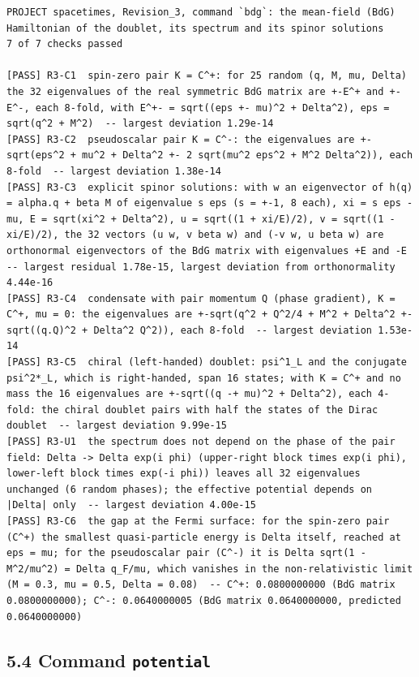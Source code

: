 \documentclass[
  10pt,
]{article}
\begin{document}
\begin{verbatim}
PROJECT spacetimes, Revision_3, command `bdg`: the mean-field (BdG) Hamiltonian of the doublet, its spectrum and its spinor solutions
7 of 7 checks passed

[PASS] R3-C1  spin-zero pair K = C^+: for 25 random (q, M, mu, Delta) the 32 eigenvalues of the real symmetric BdG matrix are +-E^+ and +-E^-, each 8-fold, with E^+- = sqrt((eps +- mu)^2 + Delta^2), eps = sqrt(q^2 + M^2)  -- largest deviation 1.29e-14
[PASS] R3-C2  pseudoscalar pair K = C^-: the eigenvalues are +-sqrt(eps^2 + mu^2 + Delta^2 +- 2 sqrt(mu^2 eps^2 + M^2 Delta^2)), each 8-fold  -- largest deviation 1.38e-14
[PASS] R3-C3  explicit spinor solutions: with w an eigenvector of h(q) = alpha.q + beta M of eigenvalue s eps (s = +-1, 8 each), xi = s eps - mu, E = sqrt(xi^2 + Delta^2), u = sqrt((1 + xi/E)/2), v = sqrt((1 - xi/E)/2), the 32 vectors (u w, v beta w) and (-v w, u beta w) are orthonormal eigenvectors of the BdG matrix with eigenvalues +E and -E  -- largest residual 1.78e-15, largest deviation from orthonormality 4.44e-16
[PASS] R3-C4  condensate with pair momentum Q (phase gradient), K = C^+, mu = 0: the eigenvalues are +-sqrt(q^2 + Q^2/4 + M^2 + Delta^2 +- sqrt((q.Q)^2 + Delta^2 Q^2)), each 8-fold  -- largest deviation 1.53e-14
[PASS] R3-C5  chiral (left-handed) doublet: psi^1_L and the conjugate psi^2*_L, which is right-handed, span 16 states; with K = C^+ and no mass the 16 eigenvalues are +-sqrt((q -+ mu)^2 + Delta^2), each 4-fold: the chiral doublet pairs with half the states of the Dirac doublet  -- largest deviation 9.99e-15
[PASS] R3-U1  the spectrum does not depend on the phase of the pair field: Delta -> Delta exp(i phi) (upper-right block times exp(i phi), lower-left block times exp(-i phi)) leaves all 32 eigenvalues unchanged (6 random phases); the effective potential depends on |Delta| only  -- largest deviation 4.00e-15
[PASS] R3-C6  the gap at the Fermi surface: for the spin-zero pair (C^+) the smallest quasi-particle energy is Delta itself, reached at eps = mu; for the pseudoscalar pair (C^-) it is Delta sqrt(1 - M^2/mu^2) = Delta q_F/mu, which vanishes in the non-relativistic limit (M = 0.3, mu = 0.5, Delta = 0.08)  -- C^+: 0.0800000000 (BdG matrix 0.0800000000); C^-: 0.0640000005 (BdG matrix 0.0640000000, predicted 0.0640000000)
\end{verbatim}

\hypertarget{command-potential}{%
\subsection{\texorpdfstring{5.4 Command
\texttt{potential}}{5.4 Command potential}}\label{command-potential}}
\end{document}
